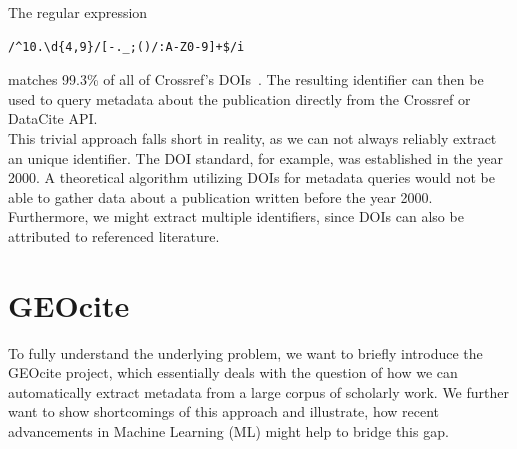 The regular expression
\begin{Verbatim}[fontsize=\small]
/^10.\d{4,9}/[-._;()/:A-Z0-9]+$/i
\end{Verbatim}
matches 99.3\% of all of Crossref's DOIs~\cite{Gilmartin_2015}. The resulting identifier can then be used to query metadata about the publication directly from the Crossref or DataCite API.\\
This trivial approach falls short in reality, as we can not always reliably extract an unique identifier. The DOI standard, for example, was established in the year 2000. A theoretical algorithm utilizing DOIs for metadata queries would not be able to gather data about a publication written before the year 2000.\\
Furthermore, we might extract multiple identifiers, since DOIs can also be attributed to referenced literature.

\section{GEOcite}\label{sec:geocite}
To fully understand the underlying problem, we want to briefly introduce the GEOcite project, which essentially deals with the question of how we can automatically extract metadata from a large corpus of scholarly work. We further want to show shortcomings of this approach and illustrate, how recent advancements in Machine Learning (ML) might help to bridge this gap.

